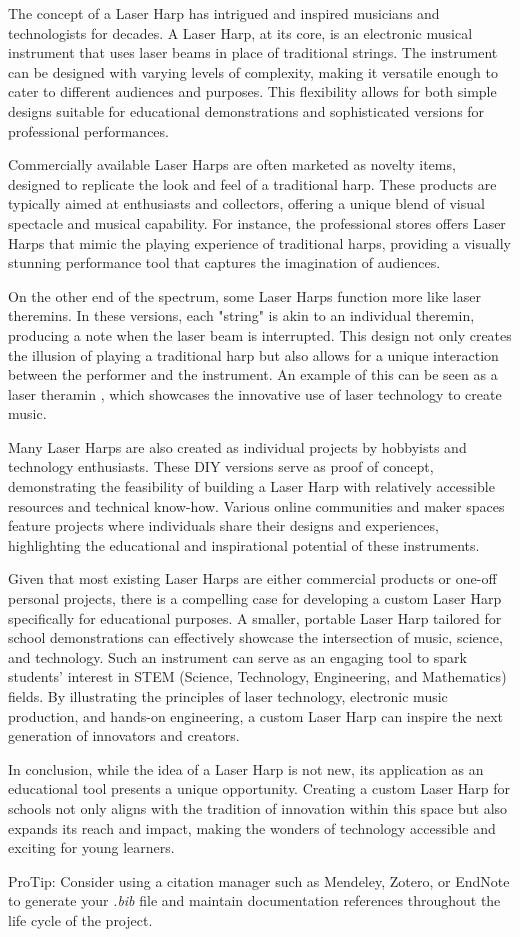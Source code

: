 The concept of a Laser Harp has intrigued and inspired musicians and technologists for decades. A Laser Harp, at its core, is an electronic musical instrument that uses laser beams in place of traditional strings. The instrument can be designed with varying levels of complexity, making it versatile enough to cater to different audiences and purposes. This flexibility allows for both simple designs suitable for educational demonstrations and sophisticated versions for professional performances.

Commercially available Laser Harps are often marketed as novelty items, designed to replicate the look and feel of a traditional harp. These products are typically aimed at enthusiasts and collectors, offering a unique blend of visual spectacle and musical capability. For instance, the professional stores offers Laser Harps that mimic the playing experience of traditional harps, providing a visually stunning performance tool that captures the imagination of audiences.

On the other end of the spectrum, some Laser Harps function more like laser theremins. In these versions, each "string" is akin to an individual theremin, producing a note when the laser beam is interrupted. This design not only creates the illusion of playing a traditional harp but also allows for a unique interaction between the performer and the instrument. An example of this can be seen as a laser theramin , which showcases the innovative use of laser technology to create music.

Many Laser Harps are also created as individual projects by hobbyists and technology enthusiasts. These DIY versions serve as proof of concept, demonstrating the feasibility of building a Laser Harp with relatively accessible resources and technical know-how. Various online communities and maker spaces feature projects where individuals share their designs and experiences, highlighting the educational and inspirational potential of these instruments.

Given that most existing Laser Harps are either commercial products or one-off personal projects, there is a compelling case for developing a custom Laser Harp specifically for educational purposes. A smaller, portable Laser Harp tailored for school demonstrations can effectively showcase the intersection of music, science, and technology. Such an instrument can serve as an engaging tool to spark students' interest in STEM (Science, Technology, Engineering, and Mathematics) fields. By illustrating the principles of laser technology, electronic music production, and hands-on engineering, a custom Laser Harp can inspire the next generation of innovators and creators.

In conclusion, while the idea of a Laser Harp is not new, its application as an educational tool presents a unique opportunity. Creating a custom Laser Harp for schools not only aligns with the tradition of innovation within this space but also expands its reach and impact, making the wonders of technology accessible and exciting for young learners.

ProTip: Consider using a citation manager such as Mendeley, Zotero, or EndNote to generate your \textit{.bib} file and maintain documentation references throughout the life cycle of the project.